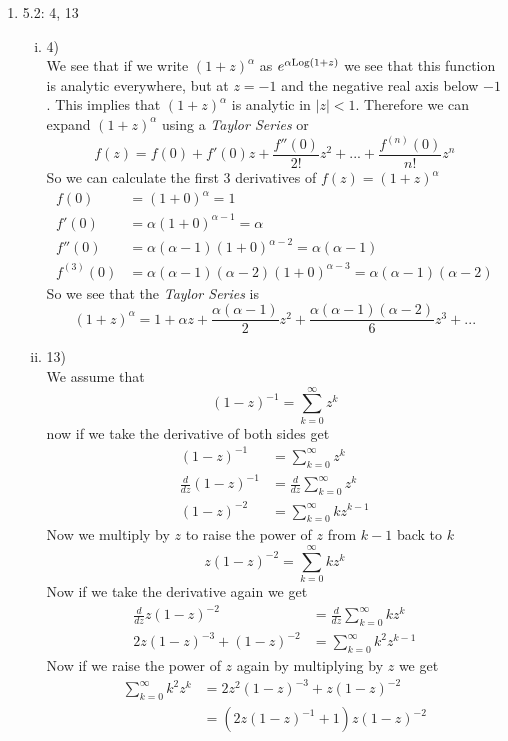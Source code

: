\documentclass[11pt]{article}
\newcommand{\Log}{\textnormal{Log}}
\begin{document}
\begin{enumerate}
\item 5.2: 4, 13
\begin{enumerate}[(i)]
\item 4)\\
We see that if we write $(1+z)^{\alpha}$ as $e^{\alpha\Log(1+z)}$ we see that this function is analytic everywhere, but at $z=-1$ and the negative real axis below $-1$. This implies that $(1+z)^{\alpha}$ is analytic in $|z|<1$. Therefore we can expand $(1+z)^{\alpha}$ using a \emph{Taylor Series} or
$$f(z) = f(0) + f'(0)z + \frac{f''(0)}{2!}z^2 +...+ \frac{f^{(n)}(0)}{n!}z^n$$ 
So we can calculate the first 3 derivatives of $f(z) = (1+z)^{\alpha}$
\begin{align*}
f(0) &= (1+0)^{\alpha} = 1\\
f'(0) &= \alpha(1+0)^{\alpha-1} = \alpha\\
f''(0) &= \alpha(\alpha-1)(1+0)^{\alpha-2}= \alpha(\alpha-1)\\
f^{(3)}(0) &= \alpha(\alpha-1)(\alpha-2)(1+0)^{\alpha-3}= \alpha(\alpha-1)(\alpha-2)
\end{align*}
So we see that the \emph{Taylor Series} is
$$(1+z)^{\alpha} = 1 + {\alpha}z + \frac{\alpha(\alpha-1)}{2}z^2 + \frac{\alpha(\alpha-1)(\alpha-2)}{6}z^3 +...$$

\item 13)\\
We assume that 
$$(1-z)^{-1} = \sum_{k=0}^{\infty}z^k$$
now if we take the derivative of both sides get
\begin{align*}
(1-z)^{-1} &= \sum_{k=0}^{\infty}z^k\\
\frac{d}{dz}(1-z)^{-1} &=\frac{d}{dz}\sum_{k=0}^{\infty}z^k\\
(1-z)^{-2} &= \sum_{k=0}^{\infty}kz^{k-1}
\end{align*}
Now we multiply by $z$ to raise the power of $z$ from $k-1$ back to $k$
$$z(1-z)^{-2} = \sum_{k=0}^{\infty}kz^{k}$$
Now if we take the derivative again we get
\begin{align*}
\frac{d}{dz} z(1-z)^{-2} &=\frac{d}{dz} \sum_{k=0}^{\infty}kz^{k}\\
2z(1-z)^{-3}+(1-z)^{-2} &= \sum_{k=0}^{\infty}k^2z^{k-1}
\end{align*}
Now if we raise the power of $z$ again by multiplying by $z$ we get
\begin{align*}
\sum_{k=0}^{\infty}k^2z^{k} &= 2z^2(1-z)^{-3}+z(1-z)^{-2} \\
&= (2z(1-z)^{-1}+1)z(1-z)^{-2}\\
\end{align*}

\end{enumerate}
\end{enumerate}
\end{document}
